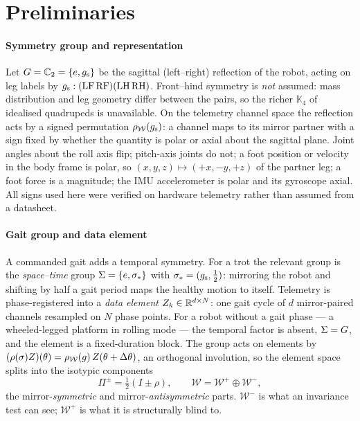 \section{Preliminaries}
\label{sec:preliminaries}

\paragraph{Symmetry group and representation}
Let $G=\mathbb{C}_2=\{e,g_{\mathrm{s}}\}$ be the sagittal (left--right) reflection of the robot, acting on leg labels by
$g_{\mathrm{s}}:(\mathrm{LF}\,\mathrm{RF})(\mathrm{LH}\,\mathrm{RH})$. Front--hind symmetry is \emph{not} assumed: mass
distribution and leg geometry differ between the pairs, so the richer $\mathbb{K}_4$ of idealised quadrupeds is
unavailable. On the telemetry channel space the reflection acts by a signed permutation $\rho_{\mathcal{W}}(g_{\mathrm{s}})$: a channel maps to
its mirror partner with a sign fixed by whether the quantity is polar or axial about the sagittal plane. Joint angles
about the roll axis flip; pitch-axis joints do not; a foot position or velocity in the body frame is polar, so
$(x,y,z)\mapsto(+x,-y,+z)$ of the partner leg; a foot force is a magnitude; the IMU accelerometer is polar and its
gyroscope axial. All signs used here were verified on hardware telemetry rather than assumed from a datasheet.

\paragraph{Gait group and data element}
A commanded gait adds a temporal symmetry. For a trot the relevant group is the \emph{space--time} group
$\Sigma=\{e,\sigma_*\}$ with $\sigma_*=(g_{\mathrm{s}},\tfrac12)$: mirroring the robot and shifting by half a gait period maps the
healthy motion to itself. Telemetry is phase-registered into a \emph{data element} $Z_k\in\mathbb{R}^{d\times N}$: one gait
cycle of $d$ mirror-paired channels resampled on $N$ phase points. For a robot without a gait phase --- a wheeled-legged
platform in rolling mode --- the temporal factor is absent, $\Sigma=G$, and the element is a fixed-duration block. The
group acts on elements by $(\rho(\sigma)Z)(\theta)=\rho_{\mathcal{W}}(g)\,Z(\theta+\Delta\theta)$, an orthogonal involution, so the
element space splits into the isotypic components
\begin{equation}
  \label{eq:isotypic}
  \Pi^{\pm}=\tfrac12(I\pm\rho),\qquad \mathcal{W}=\mathcal{W}^{+}\oplus\mathcal{W}^{-},
\end{equation}
the mirror-\emph{symmetric} and mirror-\emph{antisymmetric} parts. $\mathcal{W}^-$ is what an invariance test can see;
$\mathcal{W}^+$ is what it is structurally blind to.

